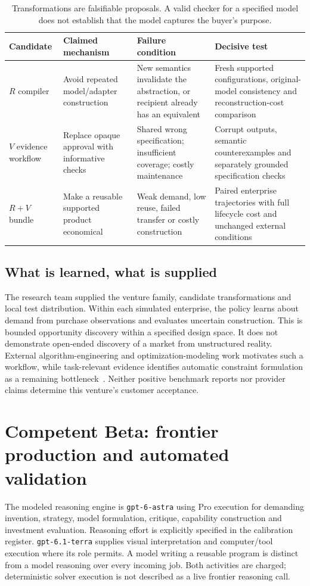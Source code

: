 \documentclass[11pt,letterpaper]{article}
\begin{document}
\begin{table}[htbp]\centering\small
\begin{tabularx}{\linewidth}{@{}p{.16\linewidth}YYY@{}}\toprule
Candidate & Claimed mechanism & Failure condition & Decisive test \\\midrule
$R$ compiler & Avoid repeated model/adapter construction & New semantics invalidate the abstraction, or recipient already has an equivalent & Fresh supported configurations, original-model consistency and reconstruction-cost comparison \\
$V$ evidence workflow & Replace opaque approval with informative checks & Shared wrong specification; insufficient coverage; costly maintenance & Corrupt outputs, semantic counterexamples and separately grounded specification checks \\
$R+V$ bundle & Make a reusable supported product economical & Weak demand, low reuse, failed transfer or costly construction & Paired enterprise trajectories with full lifecycle cost and unchanged external conditions \\\bottomrule
\end{tabularx}
\caption{Transformations are falsifiable proposals. A valid checker for a specified model does not establish that the model captures the buyer's purpose.}
\end{table}

\subsection{What is learned, what is supplied}
The research team supplied the venture family, candidate transformations and local test distribution. Within each simulated enterprise, the policy learns about demand from purchase observations and evaluates uncertain construction. This is bounded opportunity discovery within a specified design space. It does not demonstrate open-ended discovery of a market from unstructured reality. External algorithm-engineering and optimization-modeling work motivates such a workflow, while task-relevant evidence identifies automatic constraint formulation as a remaining bottleneck~\cite{AlphaEvolve,Optimus,OptEngine}. Neither positive benchmark reports nor provider claims determine this venture's customer acceptance.

\section{Competent Beta: frontier production and automated validation}
The modeled reasoning engine is \texttt{gpt-6-astra} using Pro execution for demanding invention, strategy, model formulation, critique, capability construction and investment evaluation. Reasoning effort is explicitly specified in the calibration register. \texttt{gpt-6.1-terra} supplies visual interpretation and computer/tool execution where its role permits. A model writing a reusable program is distinct from a model reasoning over every incoming job. Both activities are charged; deterministic solver execution is not described as a live frontier reasoning call.
\end{document}

